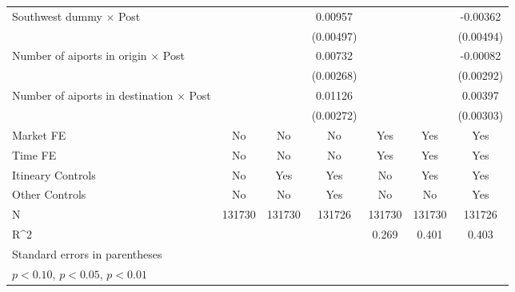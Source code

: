 \begin{table}[htbp]
\begin{tabular}{l*{6}{c}}
\addlinespace
Southwest dummy $\times$ Post&                     &                     &     0.00957\sym{*}  &                     &                     &    -0.00362         \\
                    &                     &                     &   (0.00497)         &                     &                     &   (0.00494)         \\
\addlinespace
Number of aiports in origin $\times$ Post&                     &                     &     0.00732\sym{***}&                     &                     &    -0.00082         \\
                    &                     &                     &   (0.00268)         &                     &                     &   (0.00292)         \\
\addlinespace
Number of aiports in destination $\times$ Post&                     &                     &     0.01126\sym{***}&                     &                     &     0.00397         \\
                    &                     &                     &   (0.00272)         &                     &                     &   (0.00303)         \\
\midrule
Market FE           &          No         &          No         &          No         &         Yes         &         Yes         &         Yes         \\
Time FE             &          No         &          No         &          No         &         Yes         &         Yes         &         Yes         \\
Itineary Controls   &          No         &         Yes         &         Yes         &          No         &         Yes         &         Yes         \\
Other Controls      &          No         &          No         &         Yes         &          No         &          No         &         Yes         \\
N                   &      131730         &      131730         &      131726         &      131730         &      131730         &      131726         \\
R^2                 &                     &                     &                     &       0.269         &       0.401         &       0.403         \\
\bottomrule
\multicolumn{7}{l}{\footnotesize Standard errors in parentheses}\\
\multicolumn{7}{l}{\footnotesize \sym{*} \(p<0.10\), \sym{**} \(p<0.05\), \sym{***} \(p<0.01\)}\\
\end{tabular}
\end{table}

